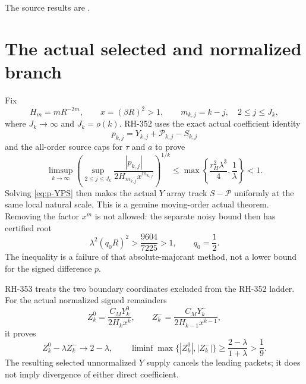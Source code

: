 \documentclass[11pt]{article}
\theoremstyle{definition}
\theoremstyle{remark}
\newcommand{\cP}{\mathcal P}
\begin{document}
The source results are
\citep{WangModulusCancellation2026,WangBoundaryGap2026,WangDirectTail2026,
WangUpperBurden2026,WangMesoscopic2026,WangLinearDepth2026,
WangTerminalLag2026,WangLogWindow2026,WangTiltTransition2026}.

\section{The actual selected and normalized branch}

Fix
\begin{equation}\label{eq:physical-scales}
 H_m=mR^{-2m},\qquad x=(\beta R)^2>1,
 \qquad m_{k,j}=k-j,\quad 2\le j\le J_k,
\end{equation}
where $J_k\to\infty$ and $J_k=o(k)$.  RH-352 uses the exact actual
coefficient identity
\begin{equation}\label{eq:p-YPS}
 p_{k,j}=Y_{k,j}+\cP_{k,j}-S_{k,j}
\end{equation}
and the all-order source caps for $\tau$ and $a$ to prove
\begin{equation}\label{eq:RH352-cap}
 \limsup_{k\to\infty}
 \left(\sup_{2\le j\le J_k}
 \frac{|p_{k,j}|}{2H_{m_{k,j}}x^{m_{k,j}}}\right)^{1/k}
 \le\max\left\{\frac{r_H^2\lambda^3}{4},\frac1\lambda\right\}<1.
\end{equation}
Solving \eqref{eq:p-YPS} then makes the actual $Y$ array track
$S-\cP$ uniformly at the same local natural scale.  This is a genuine
moving-order actual theorem.  Removing the factor $x^{m}$ is not allowed:
the separate noisy bound then has certified root
\begin{equation}\label{eq:raw-barrier}
 \lambda^2(q_0R)^2>\frac{9604}{7225}>1,
 \qquad q_0=\frac12.
\end{equation}
The inequality is a failure of that absolute-majorant method, not a lower
bound for the signed difference $p$.

RH-353 treats the two boundary coordinates excluded from the RH-352 ladder.
For the actual normalized signed remainders
\begin{equation}\label{eq:Z}
 Z_k^0=\frac{C_MY_k^0}{2H_kx^k},\qquad
 Z_k^-=\frac{C_MY_k^-}{2H_{k-1}x^{k-1}},
\end{equation}
it proves
\begin{equation}\label{eq:boundary-gap}
 Z_k^0-\lambda Z_k^-\longrightarrow2-\lambda,
 \qquad
 \liminf\max\{|Z_k^0|,|Z_k^-|\}
 \ge\frac{2-\lambda}{1+\lambda}>\frac19.
\end{equation}
The resulting selected unnormalized $Y$ supply cancels the leading packets;
it does not imply divergence of either direct coefficient.
\end{document}
